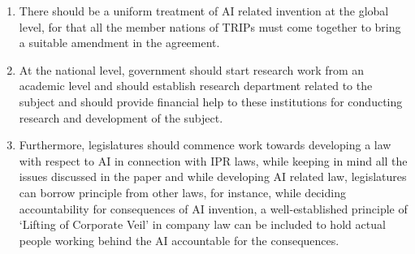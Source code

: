 \begin{multicols}{2}
\renewcommand{\theenumi}{\alph{enumi}}
\begin{enumerate}[label=\alph*.]
\item There should be a uniform treatment of AI related invention at the global level, for
that all the member nations of TRIPs must come together to bring a suitable
amendment in the agreement. 

\item At the national level, government should start research work from an academic level
and should establish research department related to the subject and should provide
financial help to these institutions for conducting research and development of the
subject.

\item Furthermore, legislatures should commence work towards developing a law with
respect to AI in connection with IPR laws, while keeping in mind all the issues
discussed in the paper and while developing AI related law, legislatures can borrow
principle from other laws, for instance, while deciding accountability for
consequences of AI invention, a well-established principle of ‘Lifting of Corporate Veil’ in company law can be included to hold actual people working behind the AI
accountable for the consequences. 
\end{enumerate}

\end{multicols}
\label{end2021-art3}
